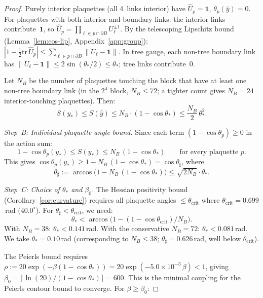 \documentclass[11pt]{article}
\theoremstyle{definition}
\newcommand{\tr}{\mathrm{tr}}
\begin{document}
\begin{proof}
Purely interior plaquettes (all 4~links interior) have
$\hat{U}_p=\mathbf{1}$, $\theta_p(\hat{y})=0$.
For plaquettes with both interior and boundary links: the
interior links contribute~$\mathbf{1}$, so
$\hat{U}_p=\prod_{\ell\in p\cap\partial B}U_\ell^{\pm 1}$.
By the telescoping Lipschitz bound (Lemma~\ref{lem:cos-lip},
Appendix~\ref{app:group}): $|1-\frac{1}{2}\tr\,\hat{U}_p|
\le\sum_{\ell\in p\cap\partial B}\|U_\ell-\mathbf{1}\|$.
In tree gauge, each non-tree boundary link has
$\|U_\ell-\mathbf{1}\|\le 2\sin(\theta_*/2)\le\theta_*$;
tree links contribute~$0$.

Let $N_B$ be the number of plaquettes touching the block
that have at least one non-tree boundary link (in the $2^4$
block, $N_B\le 72$; a tighter count gives $N_B=24$
interior-touching plaquettes).  Then:
\begin{equation}\label{eq:action-compare}
S(y_*)\le S(\hat{y})\le N_B\cdot(1-\cos\theta_*)
\le\frac{N_B}{2}\,\theta_*^2.
\end{equation}

\emph{Step~B: Individual plaquette angle bound.}
Since each term $(1-\cos\theta_p)\ge 0$ in the action sum:
\begin{equation}\label{eq:individual-plaq}
1-\cos\theta_p(y_*)\le S(y_*)\le N_B\,(1-\cos\theta_*)
\qquad\text{for every plaquette }p.
\end{equation}
This gives $\cos\theta_p(y_*)\ge 1-N_B\,(1-\cos\theta_*)
=\cos\theta_\sharp$, where
\begin{equation}\label{eq:tsharp}
\theta_\sharp:=\arccos\bigl(1-N_B\,(1-\cos\theta_*)\bigr)
\le\sqrt{2N_B}\cdot\theta_*.
\end{equation}

\emph{Step~C: Choice of $\theta_*$ and $\beta_0$.}
The Hessian positivity bound
(Corollary~\ref{cor:curvature}) requires all plaquette angles
$\le\theta_{\mathrm{crit}}$ where
$\theta_{\mathrm{crit}}=0.699$\,rad ($40.0^\circ$).
For $\theta_\sharp<\theta_{\mathrm{crit}}$, we need:
\begin{equation}\label{eq:theta-constraint}
\theta_*<\arccos\bigl(1-(1-\cos\theta_{\mathrm{crit}})/N_B\bigr).
\end{equation}
With $N_B=38$: $\theta_*<0.141$\,rad.
With the conservative $N_B=72$:
$\theta_*<0.081$\,rad.
We take $\theta_*=0.10$\,rad (corresponding to $N_B\le 38$;
$\theta_\sharp=0.626$\,rad, well below $\theta_{\mathrm{crit}}$).

The Peierls bound requires
$\rho:=20\exp(-\beta(1-\cos\theta_*))
=20\exp(-5.0\times 10^{-3}\,\beta)<1$,
giving $\beta_0=\lceil\ln(20)/(1-\cos\theta_*)\rceil=600$.
This is the minimal coupling for the Peierls contour bound
to converge.  For $\beta\ge\beta_0$:


\end{proof}
\end{document}
